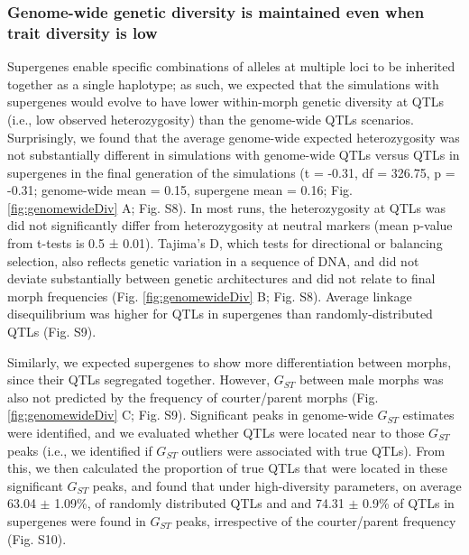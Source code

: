 \documentclass[
  11pt,
  a4paper,
]{article}
\begin{document}
\hypertarget{genome-wide-genetic-diversity-is-maintained-even-when-trait-diversity-is-low}{%
\subsubsection{Genome-wide genetic diversity is maintained even when trait diversity is low}\label{genome-wide-genetic-diversity-is-maintained-even-when-trait-diversity-is-low}}

Supergenes enable specific combinations of alleles at multiple loci to
be inherited together as a single haplotype; as such, we expected that
the simulations with supergenes would evolve to have lower within-morph
genetic diversity at QTLs (i.e., low observed heterozygosity) than the
genome-wide QTLs scenarios. Surprisingly, we found that the average
genome-wide expected heterozygosity was not substantially different in
simulations with genome-wide QTLs versus QTLs in supergenes in the final
generation of the simulations (t = -0.31, df = 326.75, p = -0.31;
genome-wide mean = 0.15, supergene mean = 0.16; Fig.
\ref{fig:genomewideDiv} A; Fig. S8). In most runs, the heterozygosity
at QTLs was did not significantly differ from heterozygosity at neutral
markers (mean p-value from t-tests is 0.5 ± 0.01). Tajima's D, which
tests for directional or balancing selection, also reflects genetic
variation in a sequence of DNA, and did not deviate substantially
between genetic architectures and did not relate to final morph
frequencies (Fig. \ref{fig:genomewideDiv} B; Fig. S8). Average linkage
disequilibrium was higher for QTLs in supergenes than
randomly-distributed QTLs (Fig. S9).

Similarly, we expected supergenes to show more differentiation between
morphs, since their QTLs segregated together. However, \(G_{ST}\) between
male morphs was also not predicted by the frequency of courter/parent
morphs (Fig. \ref{fig:genomewideDiv} C; Fig. S9). Significant peaks in
genome-wide \(G_{ST}\) estimates were identified, and we evaluated whether
QTLs were located near to those \(G_{ST}\) peaks (i.e., we identified if
\(G_{ST}\) outliers were associated with true QTLs). From this, we then
calculated the proportion of true QTLs that were located in these
significant \(G_{ST}\) peaks, and found that under high-diversity
parameters, on average 63.04
\(\pm\) 1.09\%, of randomly
distributed QTLs and and
74.31 \(\pm\)
0.9\% of QTLs in supergenes
were found in \(G_{ST}\) peaks, irrespective of the courter/parent
frequency (Fig. S10).
\end{document}

